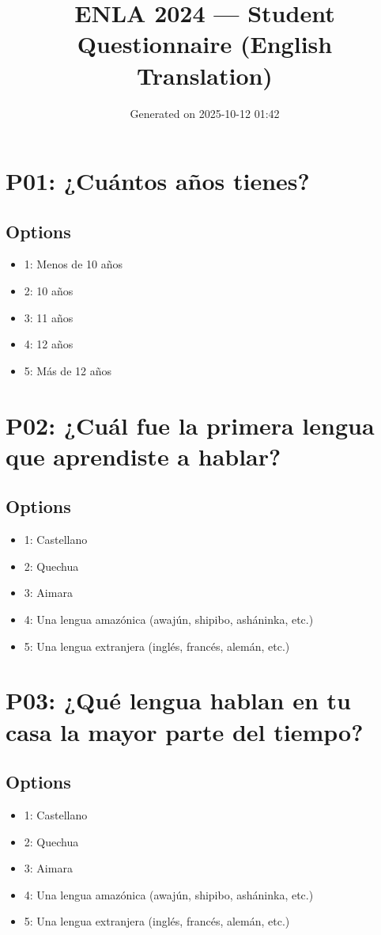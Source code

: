 \documentclass[11pt]{article}
\title{ENLA 2024 — Student Questionnaire (English Translation)}
\date{Generated on 2025-10-12 01:42}
\begin{document}
\maketitle
\tableofcontents
\newpage
\section*{P01: ¿Cuántos años tienes?}
\subsection*{Options}
\begin{itemize}[leftmargin=*]
  \item 1: Menos de 10 años
  \item 2: 10 años
  \item 3: 11 años
  \item 4: 12 años
  \item 5: Más de 12 años
\end{itemize}
\bigskip
\section*{P02: ¿Cuál fue la primera lengua que aprendiste a hablar?}
\subsection*{Options}
\begin{itemize}[leftmargin=*]
  \item 1: Castellano
  \item 2: Quechua
  \item 3: Aimara
  \item 4: Una lengua amazónica (awajún, shipibo, asháninka, etc.)
  \item 5: Una lengua extranjera (inglés, francés, alemán, etc.)
\end{itemize}
\bigskip
\section*{P03: ¿Qué lengua hablan en tu casa la mayor parte del tiempo?}
\subsection*{Options}
\begin{itemize}[leftmargin=*]
  \item 1: Castellano
  \item 2: Quechua
  \item 3: Aimara
  \item 4: Una lengua amazónica (awajún, shipibo, asháninka, etc.)
  \item 5: Una lengua extranjera (inglés, francés, alemán, etc.)
\end{itemize}
\bigskip
\end{document}
